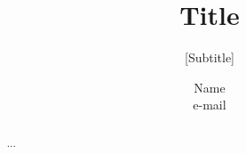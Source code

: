 \documentclass{sig-alternate}
\title{Title}
\subtitle{[Subtitle]}
\author{Name\\e-mail}
\begin{document}
\maketitle

\begin{abstract}
  ...
\end{abstract}




\nocite{*}


\end{document}
